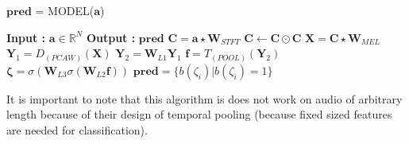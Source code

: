 \begin{algorithm}
  \caption{$\textbf{pred}$ = MODEL($\textbf{a}$) }\label{Temporal Pooling}
  \begin{algorithmic}[1]
    \Statex \textbf{Input :} $\textbf{a} \in \mathbb{R}^{N}$
    \Statex \textbf{Output :} $\textbf{pred}$  
    \State $\textbf{C} = \textbf{a} \star \textbf{W}_{STFT}$ 
    \State $\textbf{C} \leftarrow \textbf{C} \odot \textbf{C}$ 
    \State $\textbf{X} = \textbf{C} \star \textbf{W}_{MEL}$ 
    \State $\textbf{Y}_{1} = D_{(PCAW)}(\textbf{X})$ 
    \State $\textbf{Y}_{2} = \textbf{W}_{L1}\textbf{Y}_{1}$  
    \State $\textbf{f} = T_{(POOL)}(\textbf{Y}_{2})$ 
    \State $\bm{\zeta} = \sigma(\textbf{W}_{L3}\sigma(\textbf{W}_{L2}\textbf{f}))$ 
    \State $\textbf{pred} = \{ b(\zeta_{i}) | b(\zeta_{i}) = 1 \}$ 
  \end{algorithmic}
\end{algorithm}
\FloatBarrier
\noindent It is important to note that this algorithm is does not work on audio of arbitrary length because of their design of temporal pooling (because fixed sized features are needed for classification).
\bigskip

